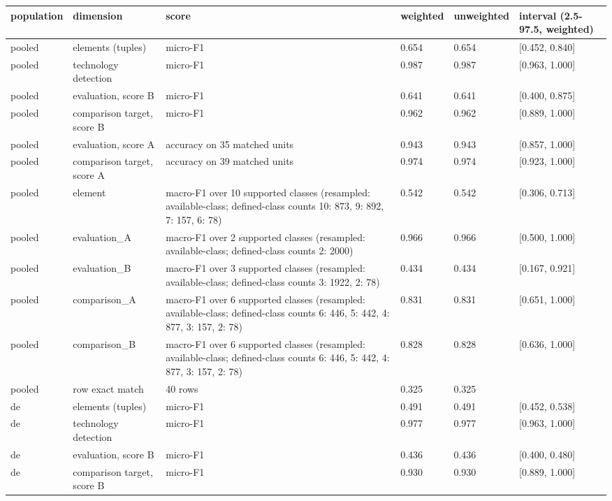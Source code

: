 \begin{table}[htbp]
\centering
\small
\begin{tabular}{llllll}
\toprule
\textbf{population} & \textbf{dimension} & \textbf{score} & \textbf{weighted} & \textbf{unweighted} & \textbf{interval (2.5-97.5, weighted)} \\
\midrule
pooled & elements (tuples) & micro-F1 & 0.654 & 0.654 & [0.452, 0.840] \\
pooled & technology detection & micro-F1 & 0.987 & 0.987 & [0.963, 1.000] \\
pooled & evaluation, score B & micro-F1 & 0.641 & 0.641 & [0.400, 0.875] \\
pooled & comparison target, score B & micro-F1 & 0.962 & 0.962 & [0.889, 1.000] \\
pooled & evaluation, score A & accuracy on 35 matched units & 0.943 & 0.943 & [0.857, 1.000] \\
pooled & comparison target, score A & accuracy on 39 matched units & 0.974 & 0.974 & [0.923, 1.000] \\
pooled & element & macro-F1 over 10 supported classes (resampled: available-class; defined-class counts {10: 873, 9: 892, 7: 157, 6: 78}) & 0.542 & 0.542 & [0.306, 0.713] \\
pooled & evaluation\_A & macro-F1 over 2 supported classes (resampled: available-class; defined-class counts {2: 2000}) & 0.966 & 0.966 & [0.500, 1.000] \\
pooled & evaluation\_B & macro-F1 over 3 supported classes (resampled: available-class; defined-class counts {3: 1922, 2: 78}) & 0.434 & 0.434 & [0.167, 0.921] \\
pooled & comparison\_A & macro-F1 over 6 supported classes (resampled: available-class; defined-class counts {6: 446, 5: 442, 4: 877, 3: 157, 2: 78}) & 0.831 & 0.831 & [0.651, 1.000] \\
pooled & comparison\_B & macro-F1 over 6 supported classes (resampled: available-class; defined-class counts {6: 446, 5: 442, 4: 877, 3: 157, 2: 78}) & 0.828 & 0.828 & [0.636, 1.000] \\
pooled & row exact match & 40 rows & 0.325 & 0.325 &  \\
de & elements (tuples) & micro-F1 & 0.491 & 0.491 & [0.452, 0.538] \\
de & technology detection & micro-F1 & 0.977 & 0.977 & [0.963, 1.000] \\
de & evaluation, score B & micro-F1 & 0.436 & 0.436 & [0.400, 0.480] \\
de & comparison target, score B & micro-F1 & 0.930 & 0.930 & [0.889, 1.000] \\

\end{tabular}
\end{table}
